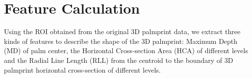 \section{Feature Calculation}
\label{sec:methodology:featurecalc}

Using the ROI obtained from the original 3D palmprint data, we extract three kinds of features to describe the shape of the 3D palmprint: Maximum Depth (MD) of palm center, the Horizontal Cross-section Area (HCA) of different levels and the Radial Line Length (RLL) from the centroid to the boundary of 3D palmprint horizontal cross-section of different levels.



